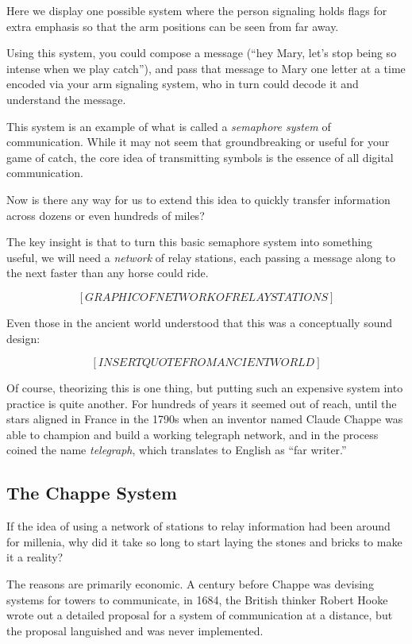 \documentclass{book}
\begin{document}
Here we display one possible system where the person signaling holds flags for extra emphasis so that the arm positions can be seen from far away.

Using this system, you could compose a message (``hey Mary, let's stop being so intense when we play catch''), and pass that message to Mary one letter at a time encoded via your arm signaling system, who in turn could decode it and understand the message.

This system is an example of what is called a \emph{semaphore system} of communication. While it may not seem that groundbreaking or useful for your game of catch, the core idea of transmitting symbols is the essence of all digital communication.

Now is there any way for us to extend this idea to quickly transfer information across dozens or even hundreds of miles?

The key insight is that to turn this basic semaphore system into something useful, we will need a \emph{network} of relay stations, each passing a message along to the next faster than any horse could ride.

\[ [GRAPHIC OF NETWORK OF RELAY STATIONS] \]

Even those in the ancient world understood that this was a conceptually sound design:

\[ [INSERT QUOTE FROM ANCIENT WORLD] \]

Of course, theorizing this is one thing, but putting such an expensive system into practice is quite another. For hundreds of years it seemed out of reach, until the stars aligned in France in the 1790s when an inventor named Claude Chappe was able to champion and build a working telegraph network, and in the process coined the name \emph{telegraph}, which translates to English as ``far writer.''

\subsection{The Chappe System}

If the idea of using a network of stations to relay information had been around for millenia, why did it take so long to start laying the stones and bricks to make it a reality?

The reasons are primarily economic. A century before Chappe was devising systems for towers to communicate, in 1684, the British thinker Robert Hooke wrote out a detailed proposal for a system of communication at a distance, but the proposal languished and was never implemented.
\end{document}
